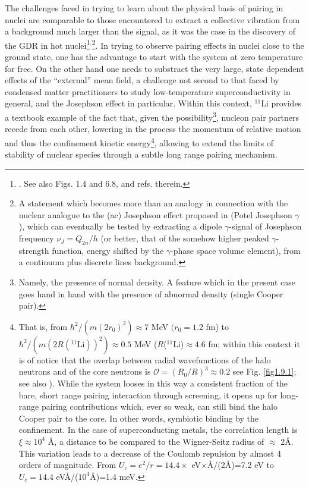 The challenges faced in trying to learn about the physical basis of pairing in nuclei are comparable to those encountered to extract a   collective vibration from a background much larger than the signal, as it was the case  in the discovery of the GDR in hot nuclei\footnote{\cite{Snover:86,Gaardhoje:85,Gaardhoje:86}. See also \cite{Bortignon:98} Figs. 1.4 and 6.8, and refs. therein.}$^,$\footnote{A statement which becomes more than an analogy in connection with the nuclear analogue to the (ac) Josephson effect proposed in \cite{Potel:20b,yy} (Potel Josephson $\gamma$), which can eventually be tested by extracting a dipole $\gamma$-signal of Josephson frequency $\nu_J=Q_{2n}/h$ (or better, that of the somehow higher peaked $\gamma$-strength function, energy shifted by the $\gamma$-phase space volume element), from a continuum plus discrete lines background.}. In trying to observe  pairing effects in nuclei close to the ground state, one has the advantage to start with the system at zero temperature for free. On the other hand one needs to substract the very large, state dependent effects of the ``external'' mean field, a challenge not second to that faced by condensed matter practitioners to study low-temperature superconductivity in general, and the Josephson effect in particular.  Within this context, $^{11}$Li provides a textbook example of the fact that, given the possibility\footnote{Namely, the presence of normal density. A feature which in the present case goes hand in hand with the presence of abnormal density (single Cooper pair).}, nucleon pair partners recede from each other, lowering in the process the momentum of relative motion and thus the confinement kinetic energy\footnote{That is, from $\hbar^2/(m(2r_0)^2)\approx 7$ MeV $(r_0=1.2$ fm) to $\hbar^2/(m(2R(^{11}\text{Li}))^2)\approx 0.5$ MeV ($R$($^{11}$Li)$\approx$4.6 fm; within this context it is of notice that the overlap between radial wavefunctions of the halo neutrons and of the core neutrons is $\mathcal O=(R_0/R)^3\approx0.2$  see Fig. \ref{fig1.9.1}; see also \cite{Broglia:19b}). While the system looses in this way a consistent fraction of the bare, short range pairing interaction through screening, it opens up for long-range pairing contributions which, ever so weak, can still bind the halo Cooper pair to the core. In other words, symbiotic binding by the confinement. In the case of superconducting metals, the correlation length is $\xi\approx 10^4$ \AA, a distance to be compared to the Wigner-Seitz radius of $\approx$ 2\AA. This variation leads to a decrease of the Coulomb repulsion by almost 4 orders of magnitude. From $U_c=e^2/r=14.4\times$ eV$\times$\AA/(2\AA)=7.2 eV to $U_c=14.4$ eV\AA/($10^4$\AA)=1.4 meV.}, allowing to extend the limits of stability of nuclear species through a subtle long range pairing mechanism. 


